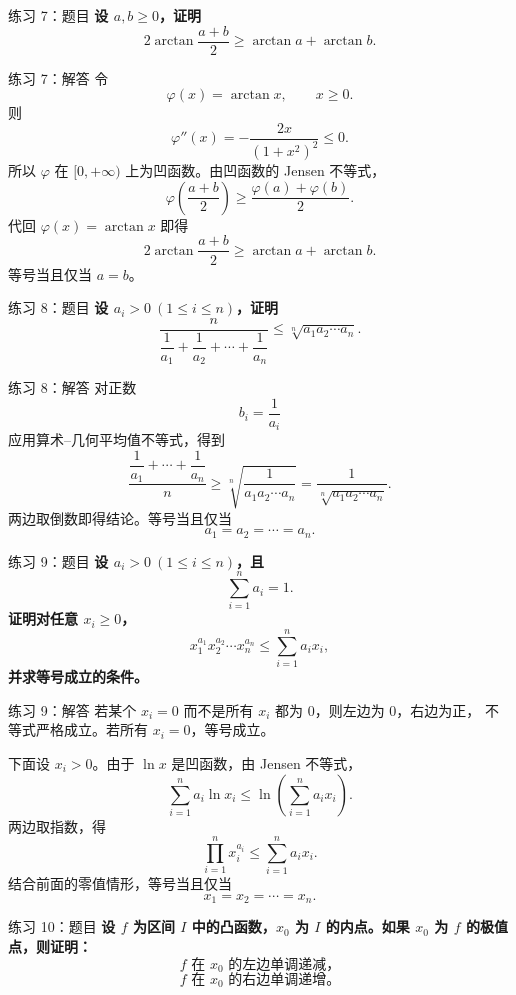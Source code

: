 \documentclass[aspectratio=169,11pt]{ctexbeamer}
\begin{document}
\begin{frame}{练习 7：题目}
\small
\textbf{设 $a,b\ge0$，证明}
\[
  2\arctan\frac{a+b}{2}\ge \arctan a+\arctan b.
\]
\end{frame}

\begin{frame}{练习 7：解答}
\small
令
\[
  \varphi(x)=\arctan x,\qquad x\ge0.
\]
则
\[
  \varphi''(x)= -\frac{2x}{(1+x^2)^2}\le0.
\]
所以 $\varphi$ 在 $[0,+\infty)$ 上为凹函数。由凹函数的 Jensen 不等式，
\[
  \varphi\!\left(\frac{a+b}{2}\right)
  \ge
  \frac{\varphi(a)+\varphi(b)}{2}.
\]
代回 $\varphi(x)=\arctan x$ 即得
\[
  2\arctan\frac{a+b}{2}\ge \arctan a+\arctan b.
\]
等号当且仅当 $a=b$。
\end{frame}

\begin{frame}{练习 8：题目}
\small
\textbf{设 $a_i>0\ (1\le i\le n)$，证明}
\[
  \frac{n}{\dfrac1{a_1}+\dfrac1{a_2}+\cdots+\dfrac1{a_n}}
  \le
  \sqrt[n]{a_1a_2\cdots a_n}.
\]
\end{frame}

\begin{frame}{练习 8：解答}
\small
对正数
\[
  b_i=\frac1{a_i}
\]
应用算术--几何平均值不等式，得到
\[
  \frac{\dfrac1{a_1}+\cdots+\dfrac1{a_n}}{n}
  \ge
  \sqrt[n]{\frac1{a_1a_2\cdots a_n}}
  =
  \frac1{\sqrt[n]{a_1a_2\cdots a_n}}.
\]
两边取倒数即得结论。等号当且仅当
\[
  a_1=a_2=\cdots=a_n.
\]
\end{frame}

\begin{frame}{练习 9：题目}
\small
\textbf{设 $a_i>0\ (1\le i\le n)$，且}
\[
  \sum_{i=1}^n a_i=1.
\]
\textbf{证明对任意 $x_i\ge0$，}
\[
  x_1^{a_1}x_2^{a_2}\cdots x_n^{a_n}
  \le
  \sum_{i=1}^n a_i x_i,
\]
\textbf{并求等号成立的条件。}
\end{frame}

\begin{frame}{练习 9：解答}
\small
若某个 $x_i=0$ 而不是所有 $x_i$ 都为 $0$，则左边为 $0$，右边为正，
不等式严格成立。若所有 $x_i=0$，等号成立。

下面设 $x_i>0$。由于 $\ln x$ 是凹函数，由 Jensen 不等式，
\[
  \sum_{i=1}^n a_i\ln x_i
  \le
  \ln\left(\sum_{i=1}^n a_i x_i\right).
\]
两边取指数，得
\[
  \prod_{i=1}^n x_i^{a_i}
  \le
  \sum_{i=1}^n a_i x_i.
\]
结合前面的零值情形，等号当且仅当
\[
  x_1=x_2=\cdots=x_n.
\]
\end{frame}

\begin{frame}{练习 10：题目}
\small
\textbf{设 $f$ 为区间 $I$ 中的凸函数，$x_0$ 为 $I$ 的内点。如果 $x_0$ 为
$f$ 的极值点，则证明：}
\[
  f \text{ 在 } x_0 \text{ 的左边单调递减，}
\]
\[
  f \text{ 在 } x_0 \text{ 的右边单调递增。}
\]
\end{frame}
\end{document}
